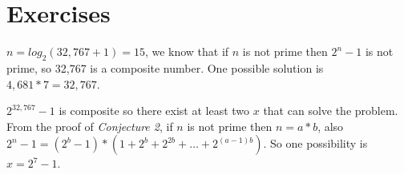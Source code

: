 \section{Exercises}


\sol $n = log_2(32,767+1) = 15$, we know that if $n$ is not prime then $2^n - 1$ is not prime, so 32,767 is a composite number. One possible solution is $4,681 * 7 = 32,767$.


\sol $2^{32,767} - 1$ is composite so there exist at least two $x$ that can solve the problem. From the proof of \textit{Conjecture 2}, if $n$ is not prime then $n = a*b$, also $2^n - 1 = (2^b - 1) * (1 + 2^b + 2^{2b} + \ldots + 2^{(a-1)b})$. So one possibility is $x = 2^7 - 1$.

